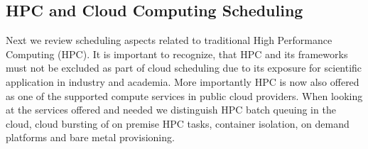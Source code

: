 \documentclass[final,5p,times,twocolumn]{elsarticle}
\begin{document}





\subsection{HPC and Cloud Computing Scheduling}
\label{sec:hpc}


Next we review scheduling aspects related to traditional High
Performance Computing (HPC). It is important to recognize, that HPC
and its frameworks must not be excluded as part of cloud scheduling
due to its exposure for scientific application in industry and
academia. More importantly HPC is now also offered as one of the supported
compute services in public cloud providers. When looking at the services offered
and needed we distinguish HPC batch queuing in the cloud, cloud
bursting of on premise HPC tasks, container isolation, on demand
platforms and bare metal provisioning.
\end{document}
